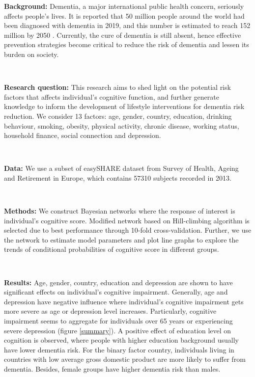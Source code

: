 \documentclass[11pt,twoside]{article}
\numberwithin{Theorem}{section}
\numberwithin{Definition}{section}
\numberwithin{Lemma}{section}
\numberwithin{Algorithm}{section}
\numberwithin{equation}{section}
\begin{document}
\textbf{Background:} Dementia, a major international public health concern, seriously affects people's lives. It is reported that 50 million people around the world had been diagnosed with dementia in 2019, and this number is estimated to reach 152 million by 2050 \cite{alzheimer2019world}. Currently, the cure of dementia is still absent, hence effective prevention strategies become critical to reduce the risk of dementia and lessen its burden on society. 

\

\textbf{Research question:} This research aims to shed light on the potential risk factors that affects individual's cognitive function, and further generate knowledge to inform the development of lifestyle interventions for dementia risk reduction. We consider 13 factors: age, gender, country, education, drinking behaviour, smoking, obesity, physical activity, chronic disease, working status, household finance, social connection and depression.

\

\textbf{Data:} We use a subset of easySHARE dataset from Survey of Health, Ageing and Retirement in Europe, which contains 57310 subjects recorded in 2013.

\

\textbf{Methods:} We construct Bayesian networks where the response of interest is individual's cognitive score. Modified network based on Hill-climbing algorithm is selected due to best performance through 10-fold cross-validation. Further, we use the network to estimate model parameters and plot line graphs to explore the trends of conditional probabilities of cognitive score in different groups.

\

\textbf{Results:} Age, gender, country, education and depression are shown to have significant effects on individual's cognitive impairment. Generally, age and depression have negative influence where individual's cognitive impairment gets more severe as age or depression level increases. Particularly, cognitive impairment seems to aggregate for individuals over 65 years or experiencing severe depression (figure \ref{summary}). A positive effect of education level on cognition is observed, where people with higher education background usually have lower dementia risk. For the binary factor country, individuals living in countries with low average gross domestic product are more likely to suffer from dementia. Besides, female groups have higher dementia risk than males.
\end{document}
